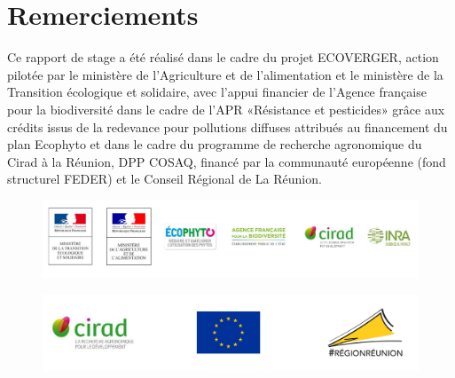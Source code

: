 \section*{Remerciements}

Ce rapport de stage a été réalisé dans le cadre du projet ECOVERGER, action pilotée par le ministère de l’Agriculture et de l’alimentation et le ministère de la Transition écologique et solidaire, avec l’appui financier de l’Agence française pour la biodiversité dans le cadre de l'APR «Résistance et pesticides» grâce aux crédits issus de la redevance pour pollutions diffuses attribués au financement du plan Ecophyto et dans le cadre du programme de recherche agronomique du Cirad à la Réunion, DPP COSAQ, financé par la communauté européenne (fond structurel FEDER) et le Conseil Régional de La Réunion.





\begin{figure}[!h]
 \centering
 \includegraphics[scale = 0.3]{photos/ecoverger.png}
\end{figure}



\begin{figure}[!h]
 \centering
 \includegraphics[scale = 0.3]{photos/cosaq.png}
\end{figure}
